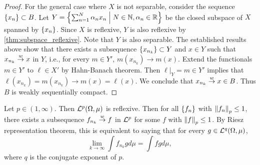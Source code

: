 \begin{proof}
    For the general case where $X$ is not separable, consider the sequence $\left\{ {x_n} \right\}\subset B$. 
    Let $Y = \left\{ \sum_{n=1}^N \alpha_n x_n \;\middle\vert\; N\in\mathbb{N}, \alpha_n\in\mathbb{R} \right\}$ be the closed subspace of 
    $X$ spanned by $\left\{ {x_n} \right\}$. Since $X$ is reflexive, $Y$ is also reflexive by 
    \cref{thm:subspace_reflexive}. Note that $Y$ is also separable. The established 
    results above show that there exists a subsequence $\left\{ {x_{n_k}} \right\}\subset Y$ and $x\in Y$ 
    such that $x_{n_k}\overset{w}{\to} x$ in $Y$, i.e., for every $m\in Y'$, $m(x_{n_k})\to m(x)$. 
    Extend the functionals $m\in Y'$ to $\ell\in X'$ by Hahn-Banach theorem. Then 
    $\ell|_Y = m\in Y'$ implies that $\ell(x_{n_k}) = m(x_{n_k})\to m(x) = \ell(x)$. 
    We conclude that $x_{n_k}\overset{w}{\to} x\in B$. Thus $B$ is weakly sequentially compact.
\end{proof}

\begin{example}
    Let $p\in(1,\infty)$. Then $\mathcal{L}^p(\Omega,\mu)$ is reflexive. Then for all 
    $\left\{ {f_n} \right\}$ with $\left\lVert {f_n} \right\rVert_p\leq 1$, there exists a subsequence $f_{n_k}\overset{w}{\to} f$ 
    in $\mathcal{L}^p$ for some $f$ with $\left\lVert {f} \right\rVert_p\leq 1$. By Riesz representation theorem, 
    this is equivalent to saying that for every $g\in\mathcal{L}^{q}(\Omega,\mu)$, 
    \begin{equation*}
        \lim_{k\to\infty} \int f_{n_k}g d\mu = \int fg d\mu,
    \end{equation*}
    where $q$ is the conjugate exponent of $p$. 
\end{example}


